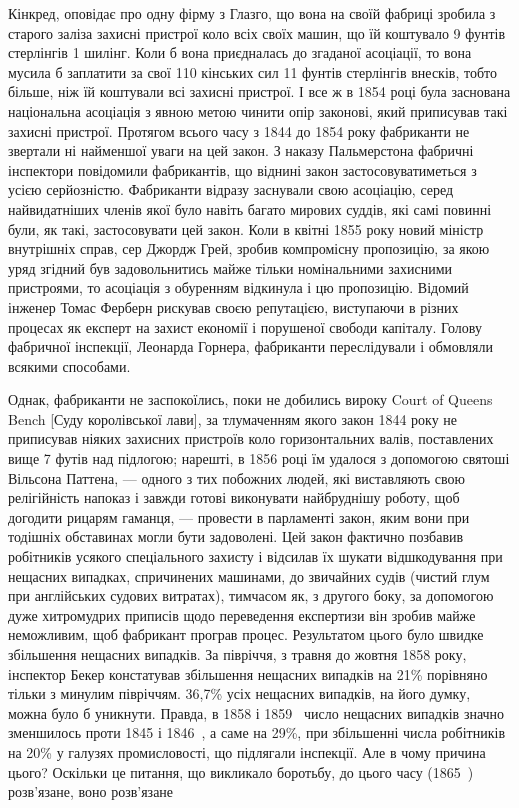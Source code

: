 \parcont{}  %
Кінкред, оповідає про одну фірму з Глазго, що вона на своїй
фабриці зробила з старого заліза захисні пристрої коло всіх
своїх машин, що їй коштувало 9 фунтів стерлінгів 1 шилінг.
Коли б вона приєдналась до згаданої асоціації, то вона мусила б
заплатити за свої 110 кінських сил 11 фунтів стерлінгів внесків,
тобто більше, ніж їй коштували всі захисні пристрої. І все ж
в 1854 році була заснована національна асоціація з явною метою
чинити опір законові, який приписував такі захисні пристрої.
Протягом всього часу з 1844 до 1854 року фабриканти не звертали
ні найменшої уваги на цей закон. З наказу Пальмерстона
фабричні інспектори повідомили фабрикантів, що віднині закон
застосовуватиметься з усією серйозністю. Фабриканти відразу
заснували свою асоціацію, серед найвидатніших членів якої було
навіть багато мирових суддів, які самі повинні були, як такі, застосовувати цей закон. Коли в квітні
1855 року новий міністр
внутрішніх справ, сер Джордж Грей, зробив компромісну пропозицію, за якою уряд згідний був
задовольнитись майже тільки
номінальними захисними пристроями, то асоціація з обуренням
відкинула і цю пропозицію. Відомий інженер Томас Ферберн
рискував своєю репутацією, виступаючи в різних процесах як
експерт на захист економії і порушеної свободи капіталу. Голову
фабричної інспекції, Леонарда Горнера, фабриканти переслідували і обмовляли всякими способами.

Однак, фабриканти не заспокоїлись, поки не добились вироку
Court of Queens Bench [Суду королівської лави], за тлумаченням
якого закон 1844 року не приписував ніяких захисних пристроїв коло горизонтальних валів, поставлених
вище 7 футів над
підлогою; нарешті, в 1856 році їм удалося з допомогою святоші
Вільсона Паттена, — одного з тих побожних людей, які виставляють
свою релігійність напоказ і завжди готові виконувати найбруднішу
роботу, щоб догодити рицарям гаманця, — провести в парламенті
закон, яким вони при тодішніх обставинах могли бути задоволені.
Цей закон фактично позбавив робітників усякого спеціального захисту і відсилав їх шукати
відшкодування при нещасних випадках,
спричинених машинами, до звичайних судів (чистий глум при
англійських судових витратах), тимчасом як, з другого боку,
за допомогою дуже хитромудрих приписів щодо переведення
експертизи він зробив майже неможливим, щоб фабрикант програв процес. Результатом цього було швидке
збільшення нещасних випадків. За півріччя, з травня до жовтня 1858 року,
інспектор Бекер констатував збільшення нещасних випадків на
21\% порівняно тільки з минулим півріччям. 36,7\% усіх нещасних
випадків, на його думку, можна було б уникнути. Правда,
в 1858 і 1859~ число нещасних випадків значно зменшилось
проти 1845 і 1846~, а саме на 29\%, при збільшенні числа робітників на 20\% у галузях
промисловості, що підлягали інспекції.
Але в чому причина цього? Оскільки це питання, що викликало
боротьбу, до цього часу (1865~) розв’язане, воно розв’язане
\parbreak{}  %
